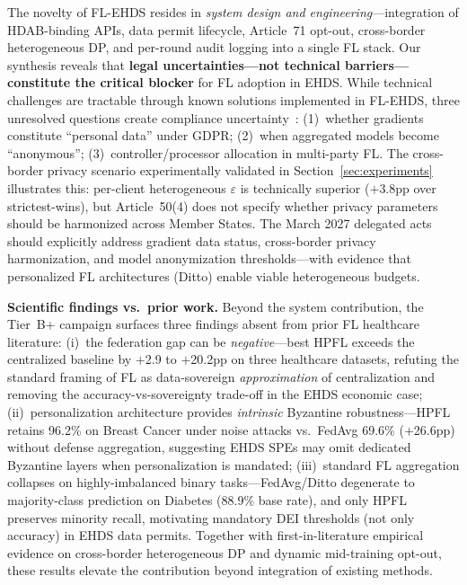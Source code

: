 \documentclass[conference]{IEEEtran}
\begin{document}
The novelty of FL-EHDS resides in \textit{system design and engineering}---integration of HDAB-binding APIs, data permit lifecycle, Article~71 opt-out, cross-border heterogeneous DP, and per-round audit logging into a single FL stack. Our synthesis reveals that \textbf{legal uncertainties---not technical barriers---constitute the critical blocker} for FL adoption in EHDS. While technical challenges are tractable through known solutions implemented in FL-EHDS, three unresolved questions create compliance uncertainty~\cite{quinn2024gdpr}: (1)~whether gradients constitute ``personal data'' under GDPR; (2)~when aggregated models become ``anonymous''; (3)~controller/processor allocation in multi-party FL. The cross-border privacy scenario experimentally validated in Section~\ref{sec:experiments} illustrates this: per-client heterogeneous $\varepsilon$ is technically superior ($+$3.8pp over strictest-wins), but Article~50(4) does not specify whether privacy parameters should be harmonized across Member States. The March 2027 delegated acts should explicitly address gradient data status, cross-border privacy harmonization, and model anonymization thresholds---with evidence that personalized FL architectures (Ditto) enable viable heterogeneous budgets.

\textbf{Scientific findings vs.\ prior work.} Beyond the system contribution, the Tier~B+ campaign surfaces three findings absent from prior FL healthcare literature: (i)~the federation gap can be \emph{negative}---best HPFL exceeds the centralized baseline by $+$2.9 to $+$20.2pp on three healthcare datasets, refuting the standard framing of FL as data-sovereign \emph{approximation} of centralization and removing the accuracy-vs-sovereignty trade-off in the EHDS economic case; (ii)~personalization architecture provides \emph{intrinsic} Byzantine robustness---HPFL retains 96.2\% on Breast Cancer under noise attacks vs.\ FedAvg 69.6\% ($+$26.6pp) without defense aggregation, suggesting EHDS SPEs may omit dedicated Byzantine layers when personalization is mandated; (iii)~standard FL aggregation collapses on highly-imbalanced binary tasks---FedAvg/Ditto degenerate to majority-class prediction on Diabetes (88.9\% base rate), and only HPFL preserves minority recall, motivating mandatory DEI thresholds (not only accuracy) in EHDS data permits. Together with first-in-literature empirical evidence on cross-border heterogeneous DP and dynamic mid-training opt-out, these results elevate the contribution beyond integration of existing methods.
\end{document}
